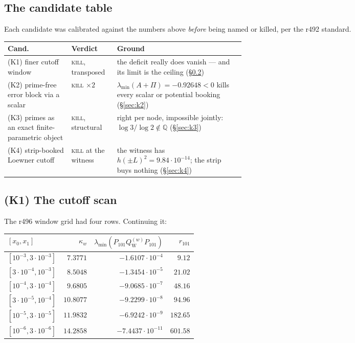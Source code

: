 \documentclass[11pt]{article}
\theoremstyle{remark}
\newcommand{\QW}{Q_{\mathrm W}}
\begin{document}
\subsection{The candidate table}

Each candidate was calibrated against the numbers above
\emph{before} being named or killed, per the r492 standard.

\begin{center}
\small
\begin{tabular}{@{}llp{0.54\linewidth}@{}}
\toprule
Cand. & Verdict & Ground \\
\midrule
(K1) finer cutoff window
  & \textsc{kill}, transposed
  & the deficit really does vanish --- and its limit is the ceiling
    (\S\ref{sec:k1}) \\
(K2) prime-free error block via a scalar
  & \textsc{kill} $\times2$
  & $\lambda_{\min}(A+\Pi)=-0.92648<0$ kills every scalar or
    potential booking (\S\ref{sec:k2}) \\
(K3) primes as an exact finite-parametric object
  & \textsc{kill}, structural
  & right per node, impossible jointly: $\log3/\log2\notin\mathbb Q$
    (\S\ref{sec:k3}) \\
(K4) strip-booked Loewner cutoff
  & \textsc{kill} at the witness
  & the witness has $h(\pm L)^2=9.84\cdot10^{-14}$; the strip buys
    nothing (\S\ref{sec:k4}) \\
\bottomrule
\end{tabular}
\end{center}

\subsection{(K1) The cutoff scan}\label{sec:k1}

The r496 window grid had four rows.  Continuing it:

\begin{center}
\small
\begin{tabular}{@{}lrrr@{}}
\toprule
$[x_0,x_1]$ & $\kappa_w$
  & $\lambda_{\min}(P_{101}\QW^{(w)}P_{101})$
  & $r_{101}$ \\
\midrule
$[10^{-3},3\cdot10^{-3}]$ & $7.3771$ & $-1.6107\cdot10^{-4}$ & $9.12$ \\
$[3\cdot10^{-4},10^{-3}]$ & $8.5048$ & $-1.3454\cdot10^{-5}$ & $21.02$ \\
$[10^{-4},3\cdot10^{-4}]$ & $9.6805$ & $-9.0685\cdot10^{-7}$ & $48.16$ \\
$[3\cdot10^{-5},10^{-4}]$ & $10.8077$ & $-9.2299\cdot10^{-8}$ & $94.96$ \\
$[10^{-5},3\cdot10^{-5}]$ & $11.9832$ & $-6.9242\cdot10^{-9}$ & $182.65$ \\
$[10^{-6},3\cdot10^{-6}]$ & $14.2858$ & $-7.4437\cdot10^{-11}$ & $601.58$ \\
\bottomrule
\end{tabular}
\end{center}
\end{document}
